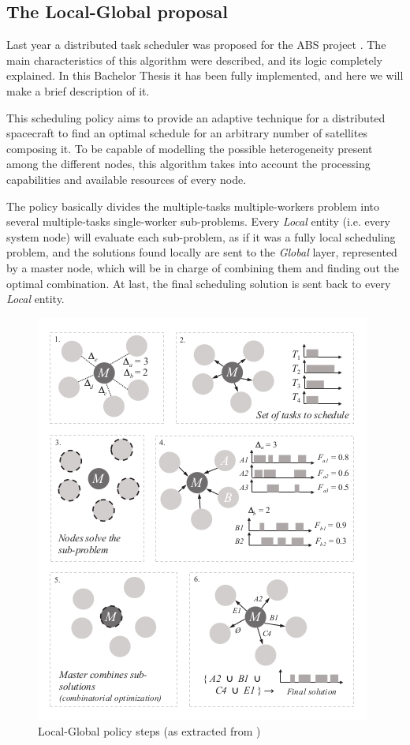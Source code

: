 \subsection{The Local-Global proposal}

Last year a distributed task scheduler was proposed for the ABS project \citep{Araguz15}. The main characteristics of this algorithm were described, and its logic completely explained. In this Bachelor Thesis it has been fully implemented, and here we will make a brief description of it.

This scheduling policy aims to provide an adaptive technique for a distributed spacecraft to find an optimal schedule for an arbitrary number of satellites composing it. To be capable of modelling the possible heterogeneity present among the different nodes, this algorithm takes into account the processing capabilities and available resources of every node.

The policy basically divides the multiple-tasks multiple-workers problem into several multiple-tasks single-worker sub-problems. Every \emph{Local} entity (i.e. every system node) will evaluate each sub-problem, as if it was a fully local scheduling problem, and the solutions found locally are sent to the \emph{Global} layer, represented by a master node, which will be in charge of combining them and finding out the optimal combination. At last, the final scheduling solution is sent back to every \emph{Local} entity.

\begin{figure}[h!]
\centering
\includegraphics[scale=0.5]{Figures/LGsteps.png} 
\caption{Local-Global policy steps (as extracted from \cite{Araguz15})}
\label{LGsteps}
\end{figure}

